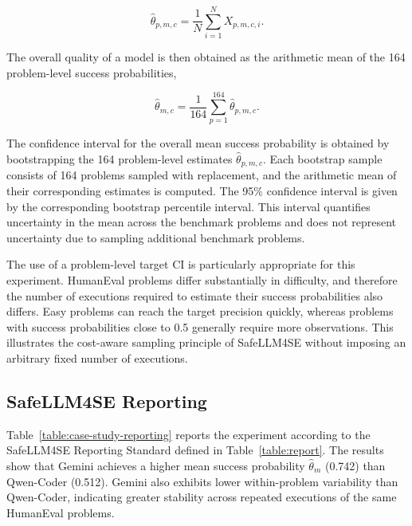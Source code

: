 \documentclass{IEEEcsmag}
\begin{document}
\begin{equation}
	\hat{\theta}_{p,m,c}
	=
	\frac{1}{N}
	\sum_{i=1}^{N} X_{p,m,c,i}  .
\end{equation}

The overall quality of a model is then obtained as the arithmetic mean of the 164 problem-level success probabilities,

\begin{equation}
	\hat{\theta}_{m,c}
	=
	\frac{1}{164}
	\sum_{p=1}^{164}\hat{\theta}_{p,m,c}.
\end{equation}


The confidence interval for the overall mean success probability is obtained by bootstrapping the 164 problem-level estimates $\hat{\theta}_{p,m,c}$. Each bootstrap sample consists of 164 problems sampled with replacement, and the arithmetic mean of their corresponding estimates is computed. The 95\% confidence interval is given by the corresponding bootstrap percentile interval. This interval quantifies uncertainty in the mean across the benchmark problems and does not represent uncertainty due to sampling additional benchmark problems.

The use of a problem-level target CI is particularly appropriate for this experiment. HumanEval problems differ substantially in difficulty, and therefore the number of executions required to estimate their success probabilities also differs. Easy problems can reach the target precision quickly, whereas problems with success probabilities close to 0.5 generally require more observations. This illustrates the cost-aware sampling principle of SafeLLM4SE without imposing an arbitrary fixed number of executions.

\subsection{SafeLLM4SE Reporting}
\label{subsection:case-study:reporting}

Table~\ref{table:case-study-reporting} reports the experiment according to the SafeLLM4SE Reporting Standard defined in Table~\ref{table:report}. The results show that Gemini achieves a higher mean success probability $\hat{\theta}_{m}$ (0.742) than Qwen-Coder (0.512). Gemini also exhibits lower within-problem variability than Qwen-Coder, indicating greater stability across repeated executions of the same HumanEval problems.
\end{document}
